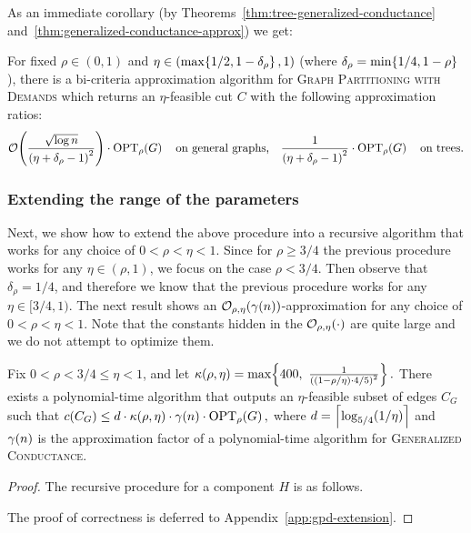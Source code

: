 As an immediate corollary (by Theorems~\ref{thm:tree-generalized-conductance} and~\ref{thm:generalized-conductance-approx}) we get:
\begin{corollary}
    For fixed $\rho\in(0,1)$ and $\eta\in\mathopen{}\left( \max\mathopen{}\left\{ 1/2,1-\delta_{\rho} \right\},1 \right)$ (where $\delta_{\rho}=\min\mathopen{}\left\{ 1/4,1-\rho \right\}$), there is a bi-criteria approximation algorithm for \textsc{Graph Partitioning with Demands} which returns an $\eta$-feasible cut $C$ with the following approximation ratios:
    \[
    \mathcal{O}\mathopen{}\left( \frac{\sqrt{\log n}}{\mathopen{}\left( \eta+\delta_{\rho}-1 \right)^2} \right)\cdot \textup{OPT}_{\rho}\mathopen{}\left( G \right)
    \quad\text{on general graphs,}\quad \frac{1}{\mathopen{}\left( \eta+\delta_{\rho}-1 \right)^2}\cdot \textup{OPT}_{\rho}\mathopen{}\left( G \right)
    \quad\text{on trees.}
    \]
\end{corollary}

\subsubsection{Extending the range of the parameters}
Next, we show how to extend the above procedure into a recursive algorithm that works for any choice of $0<\rho < \eta<1$. 
Since for $\rho\geq 3/4$ the previous procedure works for any $\eta\in(\rho,1)$, we focus on the case $\rho<3/4$. Then observe that $\delta_{\rho}=1/4$, and therefore we know that the previous procedure works for any $\eta\in[3/4,1)$.
The next result shows an $\mathcal{O}_{\rho,\eta}\mathopen{}\left( \gamma\mathopen{}\left( n \right) \right)$-approximation for any choice of $0<\rho<\eta<1$. Note that the constants hidden in the $\mathcal{O}_{\rho,\eta}\mathopen{}\left( \cdot \right)$ are quite large and we do not attempt to optimize them.

\begin{theorem}\label{thm:gpd-extension}
    Fix $0<\rho<3/4\leq \eta< 1$, and let $
        \kappa\br{\rho,\eta}=\max\brc{400,\ \frac{1}{\br{\br{1-\rho/\eta}\cdot 4/5}^2}}.$
    There exists a polynomial-time algorithm that outputs an $\eta$-feasible subset of edges $C_G$ such that $c\mathopen{}\left( C_G \right)\leq d\cdot \kappa\mathopen{}\left( \rho,\eta \right)\cdot \gamma\mathopen{}\left( n \right)\cdot \textup{OPT}_{\rho}\mathopen{}\left( G \right),
    $
    where $d=\mathopen{}\left\lceil \log_{5/4}\mathopen{}\left( 1/\eta \right) \right\rceil$ and $\gamma\mathopen{}\left( n \right)$ is the approximation factor of a polynomial-time algorithm for \textsc{Generalized Conductance}.
\end{theorem}
\begin{proof}
The recursive procedure for a component $H$ is as follows.


The proof of correctness is deferred to Appendix~\ref{app:gpd-extension}.
\end{proof}

